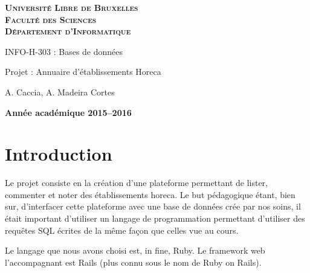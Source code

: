 \documentclass[a4paper,10pt]{article}
\begin{document}
\begin{titlepage}
    \begin{center}
        \textbf{\textsc{Université Libre de Bruxelles}}\\
        \textbf{\textsc{Faculté des Sciences}}\\
        \textbf{\textsc{Département d'Informatique}}

        \vfill{}
        \vfill{}

        \begin{center}
            {\Huge INFO-H-303 : Bases de données}
        \end{center}

        {\Huge \par}

        \begin{center}
            {\LARGE Projet : Annuaire d'établissements Horeca}
        \end{center}

        {\Huge \par}

        \begin{center}
            {\large A. Caccia, A. Madeira Cortes}
        \end{center}

        {\Huge \par}
        \vfill{}
        \vfill{}

        {\large\par}
        \vfill{}
        \vfill{}

        \textbf{Année académique 2015--2016}
    \end{center}
\end{titlepage}

\section{Introduction}

Le projet consiste en la création d'une plateforme permettant de lister, commenter et noter des établissements horeca. Le but pédagogique étant, bien sur, d'interfacer cette plateforme avec une base de données crée par nos soins, il était important d'utiliser un langage de programmation permettant d'utiliser des requêtes SQL écrites de la même façon que celles vue au cours.

Le langage que nous avons choisi est, in fine, Ruby. Le framework web l’accompagnant est Rails (plus connu sous le nom de Ruby on Rails). 
\end{document}
